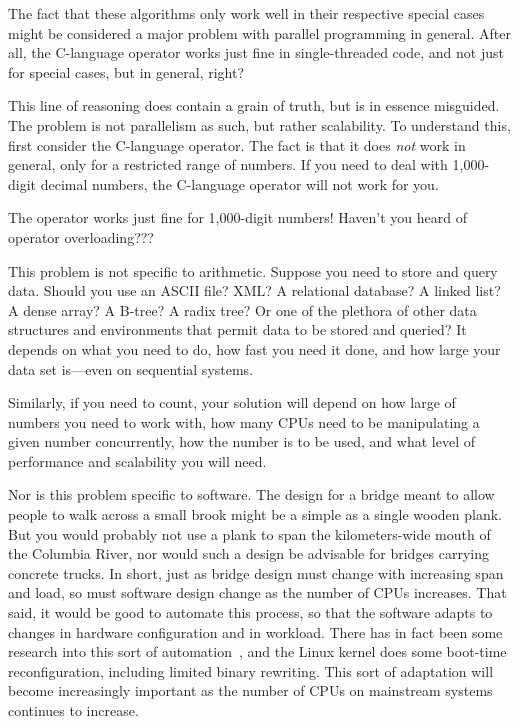 The fact that these algorithms only work well in their respective special
cases might be considered a major problem with parallel programming in
general.
After all, the C-language \co{++} operator works just fine in single-threaded
code, and not just for special cases, but in general, right?

This line of reasoning does contain a grain of truth, but is in essence
misguided.
The problem is not parallelism as such, but rather scalability.
To understand this, first consider the C-language \co{++} operator.
The fact is that it does \emph{not} work in general, only for a restricted
range of numbers.
If you need to deal with 1,000-digit decimal numbers, the C-language \co{++}
operator will not work for you.

\QuickQuiz{}
	The \co{++} operator works just fine for 1,000-digit numbers!
	Haven't you heard of operator overloading???
 \QuickQuizEnd

This problem is not specific to arithmetic.
Suppose you need to store and query data.
Should you use an ASCII file?
XML?
A relational database?
A linked list?
A dense array?
A B-tree?
A radix tree?
Or one of the plethora of other data
structures and environments that permit data to be stored and queried?
It depends on what you need to do, how fast you need it done, and how
large your data set is---even on sequential systems.

Similarly, if you need to count, your solution will depend on how large
of numbers you need to work with, how many CPUs need to be manipulating
a given number concurrently, how the number is to be used, and what
level of performance and scalability you will need.

Nor is this problem specific to software.
The design for a bridge meant to allow people to walk across a small brook
might be a simple as a single wooden plank.
But you would probably not use a plank to span the kilometers-wide mouth of
the Columbia River, nor would such a design be advisable for bridges
carrying concrete trucks.
In short, just as bridge design must change with increasing span and load,
so must software design change as the number of CPUs increases.
That said, it would be good to automate this process, so that the
software adapts to changes in hardware configuration and in workload.
There has in fact been some research into this sort of
automation~\cite{Appavoo03a,Soules03a}, and the Linux kernel does some
boot-time reconfiguration, including limited binary rewriting.
This sort of adaptation will become increasingly important as the
number of CPUs on mainstream systems continues to increase.

